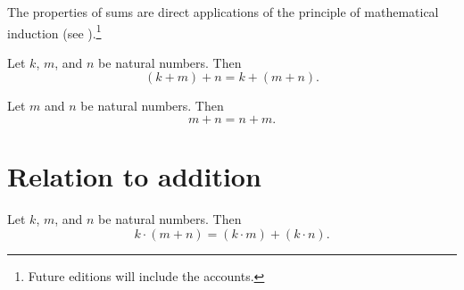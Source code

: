 The properties of sums are direct applications of the principle of mathematical induction (see ).\footnote{Future editions will include the accounts.}

\begin{proposition}[Associative]
Let $k$, $m$, and $n$ be natural numbers.
Then
\[
(k + m) + n = k + (m + n).
\]
\end{proposition}

\begin{proposition}[Commutative]
Let $m$ and $n$ be natural numbers.
Then
\[
m + n = n + m.
\]
\end{proposition}

\section*{Relation to addition}

\begin{proposition}[Distributive]
Let $k$, $m$, and $n$ be natural numbers.
Then
\[
k \cdot  (m + n) = (k \cdot  m) + (k \cdot  n).
\]
\end{proposition}
